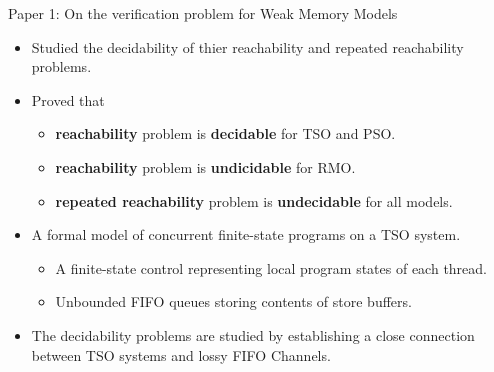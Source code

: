 \documentclass[9pt]{beamer}
\begin{document}
\begin{frame}{Paper 1: On the verification problem for Weak Memory Models}
\begin{itemize}
\pause
\item Studied the decidability of thier reachability and repeated reachability
      problems.
\pause
\item Proved that
	\begin{itemize}
  \item \textbf{reachability} problem is \textbf{decidable} for TSO and PSO.
  \item \textbf{reachability} problem is \textbf{undicidable} for RMO.
  \item \textbf{repeated reachability} problem is \textbf{undecidable} for all models.
	\end{itemize}
\pause
\item A formal model of concurrent finite-state programs on a TSO system.
	\begin{itemize}
	\item A finite-state control representing local program states of each thread.
  \item Unbounded FIFO queues storing contents of store buffers.
	\end{itemize}
\pause
\item The decidability problems are studied by establishing a close connection
      between TSO systems and lossy FIFO Channels.
\end{itemize}
\end{frame}
\end{document}

